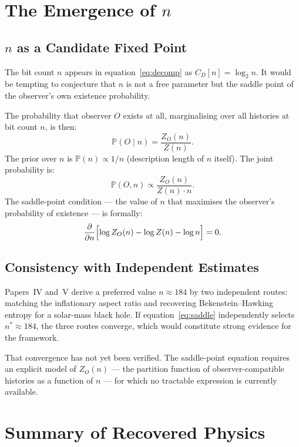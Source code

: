 \documentclass[11pt]{article}
\begin{document}
\section{The Emergence of $n$}
\label{sec:n}

\subsection{$n$ as a Candidate Fixed Point}

The bit count $n$ appears in equation~\eqref{eq:decomp} as
$C_D[n] = \log_2 n$.
It would be tempting to conjecture that $n$ is not a free parameter but the saddle point
of the observer's own existence probability.

The probability that observer $O$ exists at all, marginalising over
all histories at bit count $n$, is then:
\[
\mathbb{P}(O \mid n)
= \frac{Z_O(n)}{Z(n)}.
\]
The prior over $n$ is $\mathbb{P}(n) \propto 1/n$ (description length
of $n$ itself).
The joint probability is:
\[
\mathbb{P}(O, n)
\propto \frac{Z_O(n)}{Z(n) \cdot n}.
\]
The saddle-point condition --- the value of $n$ that maximises the
observer's probability of existence --- is formally:
\begin{equation}
\frac{\partial}{\partial n}
\Bigl[\log Z_O(n) - \log Z(n) - \log n\Bigr] = 0.
\label{eq:saddle}
\end{equation}


\subsection{Consistency with Independent Estimates}

Papers~IV and~V \cite{meskanen2026iv, meskanen2026v} derive a
preferred value $n \approx 184$ by two independent routes:
matching the inflationary aspect ratio and recovering
Bekenstein--Hawking entropy for a solar-mass black hole.
If equation~\eqref{eq:saddle} independently selects $n^* \approx 184$,
the three routes converge, which would constitute strong evidence
for the framework.

That convergence has not yet been verified.
The saddle-point equation requires an explicit model of $Z_O(n)$ ---
the partition function of observer-compatible histories as a function
of $n$ --- for which no tractable expression is currently available.




\section{Summary of Recovered Physics}
\label{sec:recovery}
\end{document}
